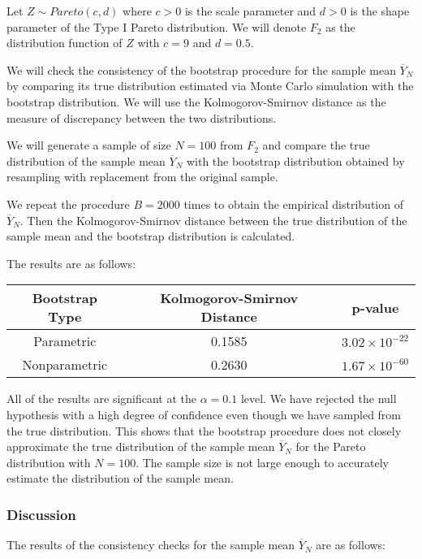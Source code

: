 \documentclass{article}
\begin{document}
Let \(Z \sim Pareto(c, d)\) where \(c > 0\) is the scale parameter and \(d > 0\) is the shape parameter of the Type I Pareto distribution. We will denote \(F_2\) as the distribution function of \(Z\) with \(c = 9\) and \(d = 0.5\).

We will check the consistency of the bootstrap procedure for the sample mean \(\overline{Y}_N\) by comparing its true distribution estimated via Monte Carlo simulation with the bootstrap distribution. We will use the Kolmogorov-Smirnov distance as the measure of discrepancy between the two distributions.

We will generate a sample of size \(N = 100\) from \(F_2\) and compare the true distribution of the sample mean \(\overline{Y}_N\) with the bootstrap distribution obtained by resampling with replacement from the original sample.

We repeat the procedure \(B = 2000\) times to obtain the empirical distribution of \(\overline{Y}_N\). Then the Kolmogorov-Smirnov distance between the true distribution of the sample mean and the bootstrap distribution is calculated.

The results are as follows:

\begin{table}[h]
\centering
\begin{tabular}{|c|c|c|}
\hline
\textbf{Bootstrap Type} & \textbf{Kolmogorov-Smirnov Distance} & \textbf{p-value} \\ \hline
Parametric & 0.1585 & \(3.02 \times 10^{-22}\) \\ \hline
Nonparametric & 0.2630 & \(1.67 \times 10^{-60}\) \\ \hline
\end{tabular}
\end{table}

All of the results are significant at the \(\alpha = 0.1\) level. We have rejected the null hypothesis with a high degree of confidence even though we have sampled from the true distribution. This shows that the bootstrap procedure does not closely approximate the true distribution of the sample mean \(\overline{Y}_N\) for the Pareto distribution with \(N = 100\). The sample size is not large enough to accurately estimate the distribution of the sample mean.

\subsubsection{Discussion}

The results of the consistency checks for the sample mean \(\overline{Y}_N\) are as follows:
\end{document}
